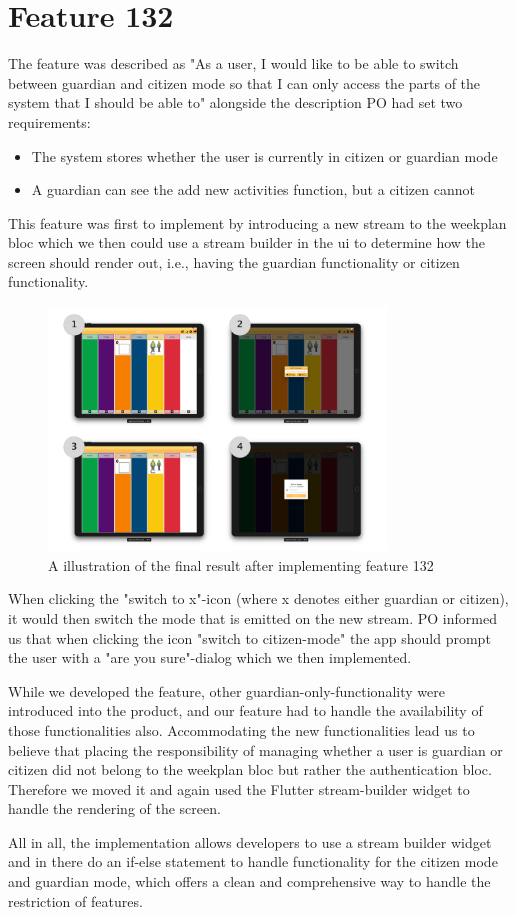 \section{Feature 132}
The feature was described as "As a user, I would like to be able to switch between guardian and citizen mode so that I can only access the parts of the system that I should be able to" alongside the description \gls{PO} had set two requirements:

\begin{itemize}
  \item The system stores whether the user is currently in citizen or guardian mode
  \item A guardian can see the add new activities function, but a citizen cannot
\end{itemize}

This feature was first to implement by introducing a new stream to the weekplan \gls{bloc} which we then could use a stream builder in the \gls{ui} to determine how the screen should render out, i.e., having the guardian functionality or citizen functionality.

\begin{figure}[h]
    \centering
    \includegraphics[width=0.8\textwidth]{figures/feature_132.pdf}
    \caption{A illustration of the final result after implementing feature 132}
    \label{fig:feature132}
\end{figure}

When clicking the "switch to x"-icon (where x denotes either guardian or citizen), it would then switch the mode that is emitted on the new stream. \gls{PO} informed us that when clicking the icon "switch to citizen-mode" the app should prompt the user with a "are you sure"-dialog which we then implemented.

While we developed the feature, other guardian-only-functionality were introduced into the product, and our feature had to handle the availability of those functionalities also. Accommodating the new functionalities lead us to believe that placing the responsibility of managing whether a user is guardian or citizen did not belong to the weekplan \gls{bloc} but rather the authentication \gls{bloc}. Therefore we moved it and again used the Flutter stream-builder widget to handle the rendering of the screen.

All in all, the implementation allows developers to use a stream builder widget and in there do an if-else statement to handle functionality for the citizen mode and guardian mode, which offers a clean and comprehensive way to handle the restriction of features.